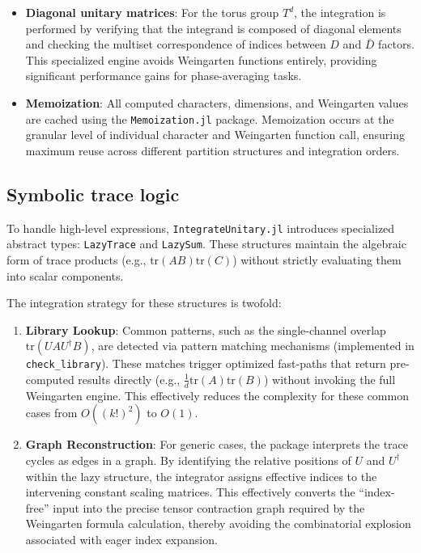 \documentclass[manuscript,screen]{acmart}
\begin{document}
\begin{itemize}
    \item \textbf{Diagonal unitary matrices}: For the torus group $T^d$, the
    integration is performed by verifying that the integrand is composed of
    diagonal elements and checking the multiset correspondence of indices
    between $D$ and $\bar{D}$ factors. This specialized engine avoids Weingarten
    functions entirely, providing significant performance gains for
    phase-averaging tasks.
    \item \textbf{Memoization}: All computed characters, dimensions, and
    Weingarten values are cached using the \texttt{Memoization.jl} package.
    Memoization occurs at the granular level of individual character and
    Weingarten function call, ensuring maximum reuse across different partition
    structures and integration orders.
\end{itemize}

\subsection{Symbolic trace logic}
To handle high-level expressions, \texttt{IntegrateUnitary.jl} introduces specialized
abstract types: \texttt{LazyTrace} and \texttt{LazySum}. These structures maintain
the algebraic form of trace products (e.g., $\mathrm{tr}(A B) \mathrm{tr}(C)$)
without strictly evaluating them into scalar components.

The integration strategy for these structures is twofold:
\begin{enumerate}
    \item \textbf{Library Lookup}: Common patterns, such as the single-channel
    overlap $\mathrm{tr}(U A U^\dagger B)$, are detected via pattern matching
    mechanisms (implemented in \texttt{check\_library}). These matches trigger optimized
    fast-paths that return pre-computed results directly (e.g.,
    $\frac{1}{d}\mathrm{tr}(A)\mathrm{tr}(B)$) without invoking the full Weingarten engine.
    This effectively reduces the complexity for these common cases from $O((k!)^2)$ to $O(1)$.
    \item \textbf{Graph Reconstruction}: For generic cases, the package
    interprets the trace cycles as edges in a graph. By identifying the relative
    positions of $U$ and $U^\dagger$ within the lazy structure, the integrator
    assigns effective indices to the intervening constant scaling matrices.
    This effectively converts the ``index-free'' input into the precise tensor
    contraction graph required by the Weingarten formula calculation, thereby
    avoiding the combinatorial explosion associated with eager index expansion.
\end{enumerate}
\end{document}
